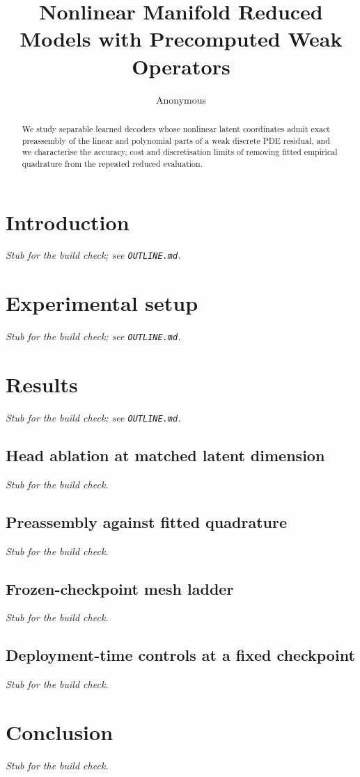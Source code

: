 \documentclass{article}
\title{Nonlinear Manifold Reduced Models with Precomputed Weak Operators}
\author{%
  Anonymous \\
}
\begin{document}
\maketitle

\begin{abstract}
We study separable learned decoders whose nonlinear latent coordinates admit
exact preassembly of the linear and polynomial parts of a weak discrete PDE
residual, and we characterise the accuracy, cost and discretisation limits of
removing fitted empirical quadrature from the repeated reduced evaluation.
\end{abstract}

\section{Introduction}\label{sec:intro}
\emph{Stub for the build check; see \texttt{OUTLINE.md}.}





\section{Experimental setup}\label{sec:setup}
\emph{Stub for the build check; see \texttt{OUTLINE.md}.}

\section{Results}\label{sec:results}
\emph{Stub for the build check; see \texttt{OUTLINE.md}.}

\subsection{Head ablation at matched latent dimension}\label{sec:exp:head}
\emph{Stub for the build check.}

\subsection{Preassembly against fitted quadrature}\label{sec:exp:quadrature}
\emph{Stub for the build check.}

\subsection{Frozen-checkpoint mesh ladder}\label{sec:exp:mesh}
\emph{Stub for the build check.}

\subsection{Deployment-time controls at a fixed checkpoint}\label{sec:exp:tuning}
\emph{Stub for the build check.}

\section{Conclusion}\label{sec:conclusion}
\emph{Stub for the build check.}



\end{document}
